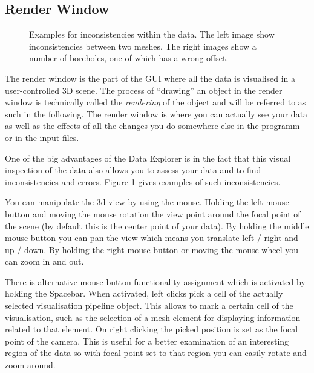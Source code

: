\subsection{Render Window}

\begin{figure}[tb]
\begin{center}
\enspace
{}
\end{center}
\caption{Examples for inconsistencies within the data. The left image show inconsistencies between two meshes. The right images show a number of boreholes, one of which has a wrong offset.} \label{fig:error}
\end{figure}

The render window is the part of the GUI where all the data is visualised in a user-controlled 3D scene. The process of ``drawing'' an object in the render window is technically called the \emph{rendering} of the object and will be referred to as such in the following. The render window is where you can actually see your data as well as the effects of all the changes you do somewhere else in the programm or in the input files.

One of the big advantages of the Data Explorer is in the fact that this visual inspection of the data also allows you to assess your data and to find inconsistencies and errors. Figure \ref{fig:error} gives examples of such inconsistencies.

You can manipulate the 3d view by using the mouse. Holding the left mouse button and moving the mouse rotation the view point around the focal point of the scene (by default this is the center point of your data). By holding the middle mouse button you can pan the view which means you translate left / right and up / down. By holding the right mouse button or moving the mouse wheel you can zoom in and out.

There is alternative mouse button functionality assignment which is activated by holding the Spacebar. When activated, left clicks pick a cell of the actually selected visualisation pipeline object. This allows to mark a certain cell of the visualisation, such as the selection of a mesh element for displaying information related to that element. On right clicking the picked position is set as the focal point of the camera. This is useful for a better examination of an interesting region of the data so with focal point set to that region you can easily rotate and zoom around.

